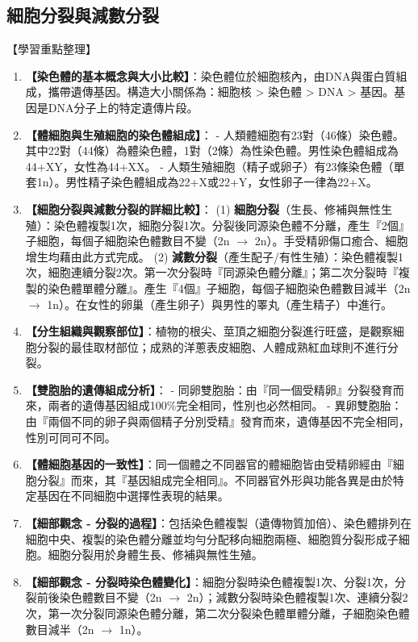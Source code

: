 \documentclass[11pt,a4paper]{article}
\begin{document}
\subsection{細胞分裂與減數分裂}
\begin{learningpoints}{【學習重點整理】}
\begin{enumerate}[label=\arabic*.]
  \item \textbf{【染色體的基本概念與大小比較】}：染色體位於細胞核內，由DNA與蛋白質組成，攜帶遺傳基因。構造大小關係為：細胞核 > 染色體 > DNA > 基因。基因是DNA分子上的特定遺傳片段。
  \item \textbf{【體細胞與生殖細胞的染色體組成】}：
  - 人類體細胞有23對（46條）染色體。其中22對（44條）為體染色體，1對（2條）為性染色體。男性染色體組成為44+XY，女性為44+XX。
  - 人類生殖細胞（精子或卵子）有23條染色體（單套1n）。男性精子染色體組成為22+X或22+Y，女性卵子一律為22+X。
  \item \textbf{【細胞分裂與減數分裂的詳細比較】}：
  (1) \textbf{細胞分裂}（生長、修補與無性生殖）：染色體複製1次，細胞分裂1次。分裂後同源染色體不分離，產生『2個』子細胞，每個子細胞染色體數目不變（2n $\rightarrow$ 2n）。手受精卵傷口癒合、細胞增生均藉由此方式完成。
  (2) \textbf{減數分裂}（產生配子/有性生殖）：染色體複製1次，細胞連續分裂2次。第一次分裂時『同源染色體分離』；第二次分裂時『複製的染色體單體分離』。產生『4個』子細胞，每個子細胞染色體數目減半（2n $\rightarrow$ 1n）。在女性的卵巢（產生卵子）與男性的睪丸（產生精子）中進行。
  \item \textbf{【分生組織與觀察部位】}：植物的根尖、莖頂之細胞分裂進行旺盛，是觀察細胞分裂的最佳取材部位；成熟的洋蔥表皮細胞、人體成熟紅血球則不進行分裂。
  \item \textbf{【雙胞胎的遺傳組成分析】}：
  - 同卵雙胞胎：由『同一個受精卵』分裂發育而來，兩者的遺傳基因組成100\%完全相同，性別也必然相同。
  - 異卵雙胞胎：由『兩個不同的卵子與兩個精子分別受精』發育而來，遺傳基因不完全相同，性別可同可不同。
  \item \textbf{【體細胞基因的一致性】}：同一個體之不同器官的體細胞皆由受精卵經由『細胞分裂』而來，其『基因組成完全相同』。不同器官外形與功能各異是由於特定基因在不同細胞中選擇性表現的結果。
  \item \textbf{【細部觀念 - 分裂的過程】}：包括染色體複製（遺傳物質加倍）、染色體排列在細胞中央、複製的染色體分離並均勻分配移向細胞兩極、細胞質分裂形成子細胞。細胞分裂用於身體生長、修補與無性生殖。
  \item \textbf{【細部觀念 - 分裂時染色體變化】}：細胞分裂時染色體複製1次、分裂1次，分裂前後染色體數目不變（2n $\rightarrow$ 2n）；減數分裂時染色體複製1次、連續分裂2次，第一次分裂同源染色體分離，第二次分裂染色體單體分離，子細胞染色體數目減半（2n $\rightarrow$ 1n）。

\end{enumerate}
\end{learningpoints}
\end{document}
